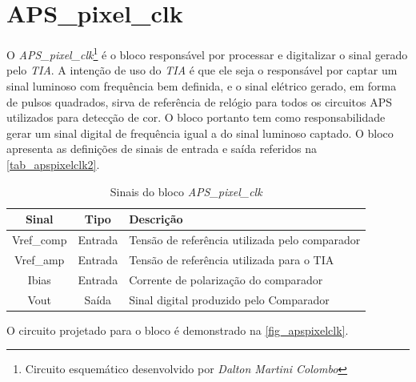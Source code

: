 \renewcommand{\NomeBloco}{\textit{APS\_pixel\_clk}}
\renewcommand{\NomeBlocoNoUnderline}{apspixelclk}
\renewcommand{\NomePTab}{tab_\NomeBlocoNoUnderline}
\renewcommand{\NomeSTab}{tab_\NomeBlocoNoUnderline2}
\renewcommand{\NomePFig}{fig_\NomeBlocoNoUnderline}
\renewcommand{\NomeSFig}{fig_\NomeBlocoNoUnderline2}
\renewcommand{\NomeTTab}{tab_\NomeBlocoNoUnderline3}
\renewcommand{\NomeQTab}{tab_\NomeBlocoNoUnderline4}

\section{APS\_pixel\_clk}

O \NomeBloco{}\footnote{Circuito esquemático desenvolvido por \textit{Dalton Martini Colombo}} \'e o bloco respons\'avel por processar e digitalizar o sinal gerado pelo \textit{TIA}. A intenção de uso do \textit{TIA} \'e que ele seja o respons\'avel por captar um sinal luminoso com frequ\^encia bem definida, e o sinal el\'etrico gerado, em forma de pulsos quadrados, sirva de refer\^encia de rel\'ogio para todos os circuitos APS utilizados para detecção de cor. O bloco portanto tem como responsabilidade gerar um sinal digital de frequ\^encia igual a do sinal luminoso captado. O bloco apresenta as definições de sinais de entrada e sa\'ida referidos na \autoref{\NomeSTab}.

\begin{table}[htbp]
\caption{Sinais do bloco \NomeBloco}
\label{\NomeSTab}
\centering
\begin{tabular}{ccl}

    \toprule
    Sinal & Tipo    & Descrição\\
    \midrule \midrule
    Vref\_comp   & Entrada   & Tensão de refer\^encia utilizada pelo comparador\\
    \midrule
    Vref\_amp   & Entrada   & Tensão de refer\^encia utilizada para o TIA\\
    \midrule
    Ibias   & Entrada   & Corrente de polarização do comparador \\
    \midrule
    Vout   & Saída   & Sinal digital produzido pelo Comparador\\
    \bottomrule
\end{tabular}
\end{table}

O circuito projetado para o bloco \'e demonstrado na \autoref{\NomePFig}.

